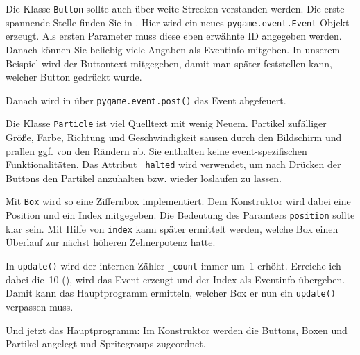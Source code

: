 
Die Klasse \texttt{Button} sollte auch über weite Strecken verstanden werden. Die erste spannende Stelle finden Sie in . Hier wird ein neues \texttt{pygame.event.Event}-Objekt erzeugt. Als ersten Parameter muss diese eben erwähnte ID angegeben werden. Danach können Sie beliebig viele Angaben als Eventinfo mitgeben. In unserem Beispiel wird der Buttontext mitgegeben, damit man später feststellen kann, welcher Button gedrückt wurde. 

Danach wird in  über \texttt{pygame.event.post()} das Event abgefeuert.


Die Klasse \texttt{Particle} ist viel Quelltext mit wenig Neuem. Partikel zufälliger Größe, Farbe, Richtung und Geschwindigkeit sausen durch den Bildschirm und prallen ggf. von den Rändern ab. Sie enthalten keine event-spezifischen Funktionalitäten. Das Attribut \texttt{\_halted} wird verwendet, um nach Drücken der Buttons den Partikel anzuhalten bzw. wieder loslaufen zu lassen.


Mit \texttt{Box} wird so eine Ziffernbox implementiert. Dem Konstruktor wird dabei eine Position und ein Index mitgegeben. Die Bedeutung des Paramters \texttt{position} sollte klar sein. Mit Hilfe von \texttt{index} kann später ermittelt werden, welche Box einen Überlauf zur nächst höheren Zehnerpotenz hatte.

In \texttt{update()} wird der internen Zähler \texttt{\_count} immer um~1 erhöht. Erreiche ich dabei die~10 (), wird das Event erzeugt und der Index als Eventinfo übergeben. Damit kann das Hauptprogramm ermitteln, welcher Box er nun ein \texttt{update()} verpassen muss.


Und jetzt das Hauptprogramm: Im Konstruktor werden die Buttons, Boxen und Partikel angelegt und Spritegroups zugeordnet.

